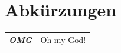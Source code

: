 \chapter*{Abk\"urzungen}
\label{sec:begriffserklaerung}

\begin{table}[H]
\begin{tabular}{p{}l}
\bfseries\itshape{OMG} & Oh my God!\\
\end{tabular}
\end{table}
